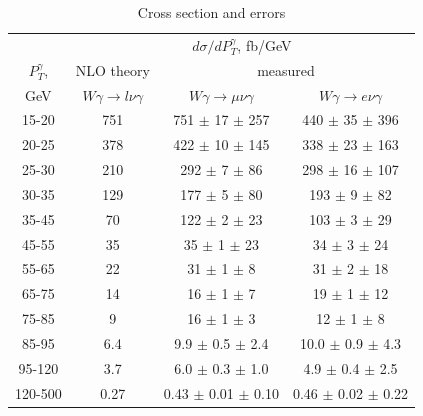 \begin{table}[h]
  \scriptsize
  \begin{center}
  \caption{Cross section and errors}
  \begin{tabular}{|c|c|c|c|}
                     & \multicolumn{3}{|c|}{$d\sigma/dP_{T}^{\gamma}$, fb/GeV} \\ 
     $P_T^{\gamma}$, & NLO theory                          &  \multicolumn{2}{|c|}{measured}      \\
    GeV              &  $W\gamma\rightarrow l\nu\gamma$ & $W\gamma\rightarrow \mu\nu\gamma$  & $W\gamma\rightarrow e\nu\gamma$    \\ \hline
    15-20 & 751 & 751 $\pm$ 17 $\pm$ 257 & 440 $\pm$ 35 $\pm$ 396\\ \hline
    20-25 & 378 & 422 $\pm$ 10 $\pm$ 145 & 338 $\pm$ 23 $\pm$ 163\\ \hline
    25-30 & 210 & 292 $\pm$ 7 $\pm$ 86 & 298 $\pm$ 16 $\pm$ 107\\ \hline
    30-35 & 129 & 177 $\pm$ 5 $\pm$ 80  & 193 $\pm$ 9 $\pm$ 82\\ \hline
    35-45 & 70 & 122 $\pm$ 2 $\pm$ 23 & 103 $\pm$ 3 $\pm$ 29\\ \hline
    45-55 & 35 & 35 $\pm$ 1 $\pm$ 23 & 34 $\pm$ 3 $\pm$ 24\\ \hline
    55-65 & 22 & 31 $\pm$ 1 $\pm$ 8  & 31 $\pm$ 2 $\pm$ 18\\ \hline
    65-75 & 14 & 16 $\pm$ 1 $\pm$ 7 & 19 $\pm$ 1 $\pm$ 12 \\ \hline
    75-85 & 9 & 16 $\pm$ 1 $\pm$ 3 & 12 $\pm$ 1 $\pm$ 8\\ \hline
    85-95 & 6.4 & 9.9 $\pm$ 0.5 $\pm$ 2.4 & 10.0 $\pm$ 0.9 $\pm$ 4.3\\ \hline
    95-120 & 3.7 & 6.0 $\pm$ 0.3 $\pm$ 1.0 & 4.9 $\pm$ 0.4 $\pm$ 2.5\\ \hline
    120-500 & 0.27 & 0.43 $\pm$ 0.01 $\pm$ 0.10 & 0.46 $\pm$ 0.02 $\pm$ 0.22\\ \hline
  \end{tabular}
  \label{tab:cs_mc_vs_meas_WGamma}
  \end{center}
\end{table}
 

